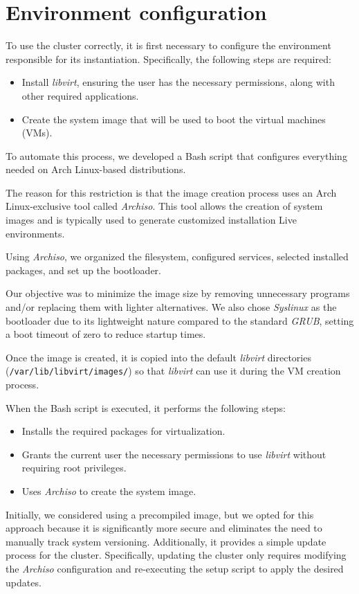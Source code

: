 \section{Environment configuration}
To use the cluster correctly, it is first necessary to configure the 
environment responsible for its instantiation. Specifically, the following
steps are required:
\begin{itemize}
	\item Install \textit{libvirt}, ensuring the user has the necessary permissions,
    along with other required applications.
	\item Create the system image that will be used to boot the virtual
    machines (VMs).
\end{itemize}
To automate this process, we developed a Bash script that configures 
everything needed on Arch Linux-based distributions.

The reason for this restriction is that the image creation process uses 
an Arch Linux-exclusive tool called \textit{Archiso}\cite{6}. 
This tool allows the creation of system images and is typically used 
to generate customized installation Live environments.

Using \textit{Archiso}, we organized the filesystem, configured services, selected 
installed packages, and set up the bootloader.

Our objective was to minimize the image size by removing unnecessary programs 
and/or replacing them with lighter alternatives. We also chose \textit{Syslinux} 
as the bootloader due to its lightweight nature compared to the standard 
\textit{GRUB}, setting a boot timeout of zero to reduce startup times.

Once the image is created, it is copied into the default 	\textit{libvirt} directories
(\texttt{/var/lib/libvirt/images/}) so that \textit{libvirt} can use it during 
the VM creation process.

When the Bash script is executed, it performs the following steps:
\begin{itemize}
	\item Installs the required packages for virtualization.
	\item Grants the current user the necessary permissions to use \textit{libvirt} 
    without requiring root privileges.
  \item Uses \textit{Archiso} to create the system image.
\end{itemize}
      Initially, we considered using a precompiled image, but we opted for this 
      approach because it is significantly more secure and eliminates the need to 
      manually track system versioning. Additionally, it provides a simple update 
      process for the cluster. Specifically, updating the cluster only requires modifying 
      the \textit{Archiso} configuration and re-executing the setup script to apply 
      the desired updates.
